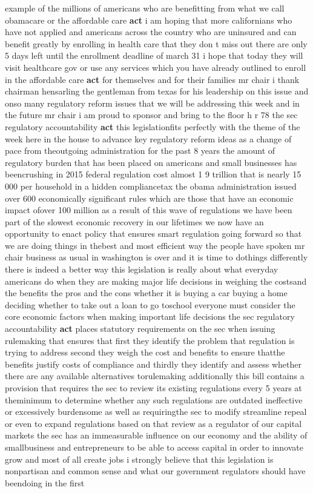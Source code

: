 \documentclass{article}
\begin{document}
example of the millions of americans who are benefitting from what we call obamacare or the affordable care {\bf \color{red} act} i am hoping that more californians who have not applied and americans across the country who are uninsured and can benefit greatly by enrolling in health care that they don t miss out there are only 5 days left until the enrollment deadline of march 31 i hope that today they will visit healthcare gov or use any services which you have already outlined to enroll in the affordable care {\bf \color{red} act} for themselves and for their families
\vspace{8mm}
mr chair i thank chairman hensarling the gentleman from texas for his leadership on this issue and onso many regulatory reform issues that we will be addressing this week and in the future mr chair i am proud to sponsor and bring to the floor h r 78 the sec regulatory accountability {\bf \color{red} act} this legislationfits perfectly with the theme of the week here in the house to advance key regulatory reform ideas as a change of pace from theoutgoing administration for the past 8 years the amount of regulatory burden that has been placed on americans and small businesses has beencrushing in 2015 federal regulation cost almost 1 9 trillion that is nearly 15 000 per household in a hidden compliancetax the obama administration issued over 600 economically significant rules which are those that have an economic impact ofover 100 million as a result of this wave of regulations we have been part of the slowest economic recovery in our lifetimes we now have an opportunity to enact policy that ensures smart regulation going forward so that we are doing things in thebest and most efficient way the people have spoken mr chair business as usual in washington is over and it is time to dothings differently there is indeed a better way this legislation is really about what everyday americans do when they are making major life decisions in weighing the costsand the benefits the pros and the cons whether it is buying a car buying a home deciding whether to take out a loan to go toschool everyone must consider the core economic factors when making important life decisions the sec regulatory accountability {\bf \color{red} act} places statutory requirements on the sec when issuing rulemaking that ensures that first they identify the problem that regulation is trying to address second they weigh the cost and benefits to ensure thatthe benefits justify costs of compliance and thirdly they identify and assess whether there are any available alternatives torulemaking additionally this bill contains a provision that requires the sec to review its existing regulations every 5 years at theminimum to determine whether any such regulations are outdated ineffective or excessively burdensome as well as requiringthe sec to modify streamline repeal or even to expand regulations based on that review as a regulator of our capital markets the sec has an immeasurable influence on our economy and the ability of smallbusiness and entrepreneurs to be able to access capital in order to innovate grow and most of all create jobs i strongly believe that this legislation is nonpartisan and common sense and what our government regulators should have beendoing in the first 
\end{document}
